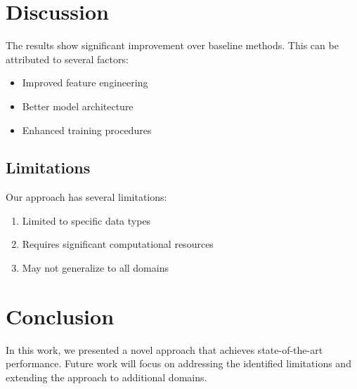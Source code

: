 \documentclass{article}
\begin{document}
\section{Discussion}
\label{sec:discussion}

The results show significant improvement over baseline methods. This can be attributed to several factors:

\begin{itemize}
\item Improved feature engineering
\item Better model architecture
\item Enhanced training procedures
\end{itemize}

\subsection{Limitations}
\label{subsec:limitations}

Our approach has several limitations:

\begin{enumerate}
\item Limited to specific data types
\item Requires significant computational resources
\item May not generalize to all domains
\end{enumerate}

\section{Conclusion}
\label{sec:conclusion}

In this work, we presented a novel approach that achieves state-of-the-art performance. Future work will focus on addressing the identified limitations and extending the approach to additional domains.



\end{document}
